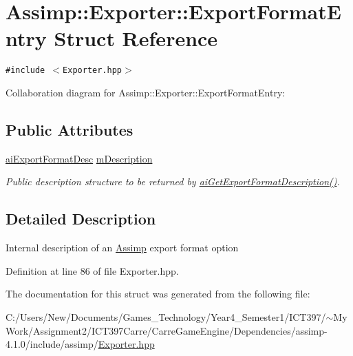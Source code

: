 \hypertarget{struct_assimp_1_1_exporter_1_1_export_format_entry}{
\section{Assimp::Exporter::ExportFormatEntry Struct Reference}
\label{struct_assimp_1_1_exporter_1_1_export_format_entry}
}
{\tt \#include $<$Exporter.hpp$>$}

Collaboration diagram for Assimp::Exporter::ExportFormatEntry:\subsection*{Public Attributes}
\begin{CompactItemize}
\item 
\hypertarget{struct_assimp_1_1_exporter_1_1_export_format_entry_59f8bf48e35a70ac0540c9b65d4b891d}{
\hyperlink{structai_export_format_desc}{aiExportFormatDesc} \hyperlink{struct_assimp_1_1_exporter_1_1_export_format_entry_59f8bf48e35a70ac0540c9b65d4b891d}{mDescription}}
\label{struct_assimp_1_1_exporter_1_1_export_format_entry_59f8bf48e35a70ac0540c9b65d4b891d}

\begin{CompactList}\small\item\em Public description structure to be returned by \hyperlink{cexport_8h_dda7f2e6611f719af6c8a4a0bef0a0a2}{aiGetExportFormatDescription()}. \item\end{CompactList}\end{CompactItemize}


\subsection{Detailed Description}
Internal description of an \hyperlink{namespace_assimp}{Assimp} export format option 

Definition at line 86 of file Exporter.hpp.

The documentation for this struct was generated from the following file:\begin{CompactItemize}
\item 
C:/Users/New/Documents/Games\_\-Technology/Year4\_\-Semester1/ICT397/$\sim$My Work/Assignment2/ICT397Carre/CarreGameEngine/Dependencies/assimp-4.1.0/include/assimp/\hyperlink{_exporter_8hpp}{Exporter.hpp}\end{CompactItemize}
